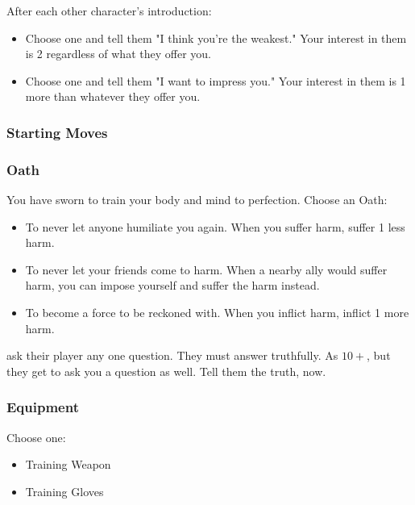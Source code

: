After each other character's introduction:
\begin{itemize}
\item Choose one and tell them "I think you're the weakest." Your interest in them is 2 regardless of what they offer you.
\item Choose one and tell them "I want to impress you." Your interest in them is 1 more than whatever they offer you.
\end{itemize}

\subsubsection{Starting Moves}

\subsubsection{Oath}
You have sworn to train your body and mind to perfection. Choose an Oath:
\begin{itemize}
\item To never let anyone humiliate you again. When you suffer harm, suffer 1 less harm.
\item To never let your friends come to harm. When a nearby ally would suffer harm, you can impose yourself and suffer the harm instead.
\item To become a force to be reckoned with. When you inflict harm, inflict 1 more harm.
\end{itemize}

{ask their player any one question. They must answer truthfully.}
{As $10+$, but they get to ask you a question as well. Tell them the truth, now.}


\subsubsection{Equipment}

Choose one:
\begin{itemize}
\item Training Weapon
\item Training Gloves
\end{itemize}